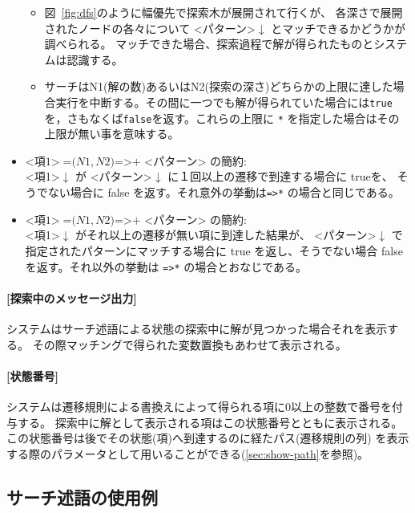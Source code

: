 \documentclass{article}
\begin{document}
\begin{itemize}
\begin{itemize}
\item 図~{\ref{fig:dfs}}のように幅優先で探索木が展開されて行くが、
  各深さで展開されたノードの各々について <パターン>$\downarrow$ とマッチできるかどうかが調べられる。
  マッチできた場合、探索過程で解が得られたものとシステムは認識する。

\item サーチはN1(解の数)あるいはN2(探索の深さ)どちらかの上限に達した場合実行を中断する。その間に一つでも解が得られていた場合には\texttt{true}を，さもなくば\texttt{false}を返す。これらの上限に \texttt{*} を指定した場合はその上限が無い事を意味する。
\end{itemize}

\item $\mbox{<項1>}\; \mbox{=(}N1, N2\mbox{)=>+ <パターン>}$ の簡約:\\
      <項1>$\downarrow$ が <パターン>$\downarrow$ に１回以上の遷移で到達する場合に trueを、
	そうでない場合に false を返す。それ意外の挙動は\verb|=>*| の場合と同じである。

\item $\mbox{<項1>}\; \mbox{=(}N1, N2\mbox{)=>+ <パターン>}$ の簡約:\\
      <項1>$\downarrow$ がそれ以上の遷移が無い項に到達した結果が、
      <パターン>$\downarrow$ で指定されたパターンにマッチする場合に true を返し、そうでない場合
      false を返す。それ以外の挙動は \verb|=>*| の場合とおなじである。
\end{itemize}

\paragraph{[探索中のメッセージ出力]}
システムはサーチ述語による状態の探索中に解が見つかった場合それを表示する。
その際マッチングで得られた変数置換もあわせて表示される。

\paragraph{[状態番号]}
システムは遷移規則による書換えによって得られる項に0以上の整数で番号を付与する。
探索中に解として表示される項はこの状態番号とともに表示される。
この状態番号は後でその状態(項)へ到達するのに経たパス(遷移規則の列) を表示する際のパラメータとして用いることができる(\ref{sec:show-path}を参照)。

\subsection{サーチ述語の使用例}
\label{sec:search-example-1}
\end{document}
